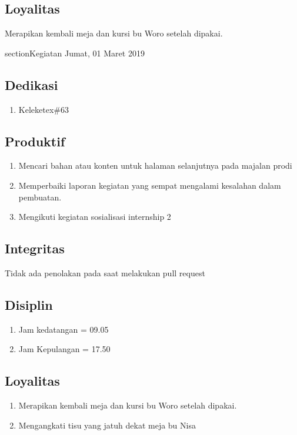 \subsection{Loyalitas}
Merapikan kembali meja dan kursi bu Woro setelah dipakai.

section{Kegiatan Jumat, 01 Maret 2019}
\subsection{Dedikasi}
\begin{enumerate}
\item Keleketex\#63
\end{enumerate}
\subsection{Produktif}
\begin{enumerate}
\item Mencari bahan atau konten untuk halaman selanjutnya pada majalan prodi
\item Memperbaiki laporan kegiatan yang sempat mengalami kesalahan dalam pembuatan.
\item  Mengikuti kegiatan sosialisasi internship 2
\end {enumerate}
\subsection{Integritas}
Tidak ada penolakan pada saat melakukan pull request
\subsection{Disiplin}
\begin{enumerate}
\item Jam kedatangan = 09.05
\item Jam Kepulangan = 17.50
\end{enumerate}
\subsection{Loyalitas}
\begin{enumerate}
\item Merapikan kembali meja dan kursi bu Woro setelah dipakai. 
\item Mengangkati tisu yang jatuh dekat meja bu Nisa
\end{enumerate}

